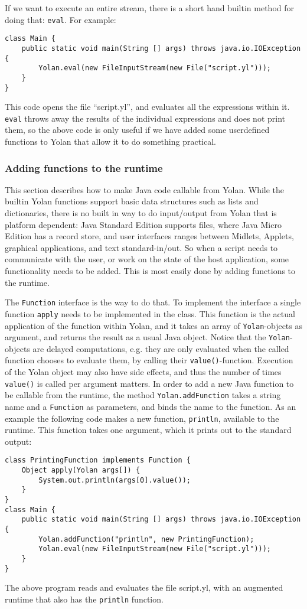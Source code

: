 \documentclass[11pt]{report}
\begin{document}
If we want to execute an entire stream, there is a short hand builtin method for doing that: \verb|eval|. For example:
\begin{lstlisting}
class Main {
    public static void main(String [] args) throws java.io.IOException {
        Yolan.eval(new FileInputStream(new File("script.yl")));
    }
}
\end{lstlisting}
This code opens the file ``script.yl'', and evaluates all the expressions within it. 
\verb|eval| throws away the results of the individual expressions and does not print them,
so the above code is only useful if we have added some userdefined functions to Yolan that allow it to do something practical.

\subsubsection{Adding functions to the runtime}
This section describes how to make Java code callable from Yolan.
While the builtin Yolan functions support basic data structures such as lists and dictionaries,  there is no built in way to do input/output from Yolan that is platform dependent: Java Standard Edition supports files, where Java Micro Edition has a record store, and user interfaces ranges between Midlets, Applets, graphical applications, and text standard-in/out.
So when a script needs to communicate with the user, or work on the state of the host application, 
some functionality needs to be added. This is most easily done by adding functions to the runtime.

The \verb|Function| interface is the way to do that. To implement the interface a single function \verb|apply| needs to be implemented in the class. 
This function is the actual application of the function within Yolan, and
it takes an array of \verb|Yolan|-objects as argument, and returns the result as a usual Java object.
Notice that the \verb|Yolan|-objects are delayed computations, e.g. they are only evaluated when the called function chooses to evaluate them, by calling their \verb|value()|-function.
Execution of the Yolan object may also have side effects, and thus the number of times \verb|value()| is called per argument matters.
In order to add a new Java function to be callable from the runtime, the method \verb|Yolan.addFunction| takes a string name and a \verb|Function| as parameters, and binds the name to the function. As an example the following code makes a new function, \verb|println|, available to the runtime. This function takes one argument, which it prints out to the standard output:
\begin{lstlisting}
class PrintingFunction implements Function {
    Object apply(Yolan args[]) {
        System.out.println(args[0].value());
    }
}
class Main {
    public static void main(String [] args) throws java.io.IOException {
        Yolan.addFunction("println", new PrintingFunction);
        Yolan.eval(new FileInputStream(new File("script.yl")));
    }
}
\end{lstlisting} 
The above program reads and evaluates the file script.yl, with an augmented runtime that also has the \verb|println| function.
\end{document}
